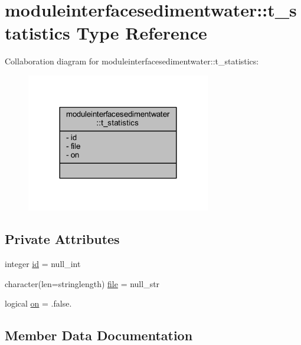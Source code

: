 \hypertarget{structmoduleinterfacesedimentwater_1_1t__statistics}{}\section{moduleinterfacesedimentwater\+:\+:t\+\_\+statistics Type Reference}
\label{structmoduleinterfacesedimentwater_1_1t__statistics}


Collaboration diagram for moduleinterfacesedimentwater\+:\+:t\+\_\+statistics\+:\nopagebreak
\begin{figure}[H]
\begin{center}
\leavevmode
\includegraphics[width=228pt]{structmoduleinterfacesedimentwater_1_1t__statistics__coll__graph}
\end{center}
\end{figure}
\subsection*{Private Attributes}
\begin{DoxyCompactItemize}
\item 
integer \mbox{\hyperlink{structmoduleinterfacesedimentwater_1_1t__statistics_a7dc446c585e8409f26d3375ed1a85e7f}{id}} = null\+\_\+int
\item 
character(len=stringlength) \mbox{\hyperlink{structmoduleinterfacesedimentwater_1_1t__statistics_a24d99c2280b8846c0ac2b4a8199f5752}{file}} = null\+\_\+str
\item 
logical \mbox{\hyperlink{structmoduleinterfacesedimentwater_1_1t__statistics_abe047cd2da88864de410a0d29a6e7408}{on}} = .false.
\end{DoxyCompactItemize}


\subsection{Member Data Documentation}
\mbox{\label{structmoduleinterfacesedimentwater_1_1t__statistics_a24d99c2280b8846c0ac2b4a8199f5752}} 
